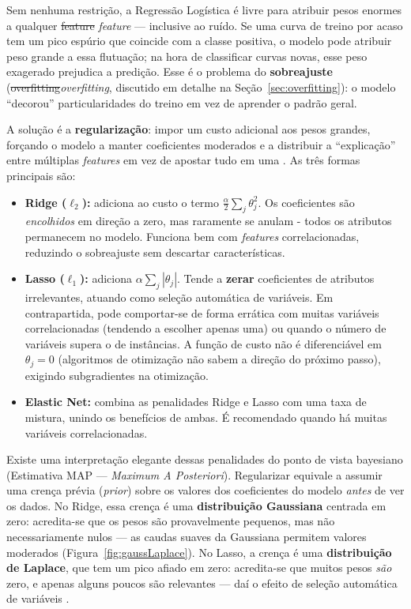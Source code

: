 \documentclass[msc]{on} %
\makeatletter
\providecommand{\DIFaddtex}[1]{{\protect\color{red}#1}} %
\providecommand{\DIFdeltex}[1]{{\protect\color{red}\sout{#1}}} %
\providecommand{\DIFaddbegin}{} %
\providecommand{\DIFaddend}{} %
\providecommand{\DIFdelbegin}{} %
\providecommand{\DIFdelend}{} %
\providecommand{\DIFadd}[1]{\texorpdfstring{\DIFaddtex{#1}}{#1}} %
\providecommand{\DIFdel}[1]{\texorpdfstring{\DIFdeltex{#1}}{}} %
\let\sout@orig\sout %
\renewcommand{\sout}[1]{\ifmmode\text{\sout@orig{\ensuremath{#1}}}\else\sout@orig{#1}\fi} %
\makeatother
\begin{document}
Sem nenhuma restrição, a Regressão Logística é livre para atribuir pesos enormes a qualquer \DIFdelbegin \DIFdel{feature }\DIFdelend \DIFaddbegin \textit{\DIFadd{feature}} \DIFaddend --- inclusive ao ruído. Se uma curva de treino por acaso tem um pico espúrio que coincide com a classe positiva, o modelo pode atribuir peso grande a essa flutuação; na hora de classificar curvas novas, esse peso exagerado prejudica a predição. Esse é o problema do \textbf{sobreajuste} (\DIFdelbegin \DIFdel{overfitting}\DIFdelend \DIFaddbegin \textit{\DIFadd{overfitting}}\DIFaddend , discutido em detalhe na Seção~\ref{sec:overfitting}): o modelo ``decorou'' particularidades do treino em vez de aprender o padrão geral.

A solução é a \textbf{regularização}: impor um custo adicional aos pesos grandes, forçando o modelo a manter coeficientes moderados e a distribuir a ``explicação'' entre múltiplas \textit{features} em vez de apostar tudo em uma \citep{geron2019maos, Levada2026}. As três formas principais são:

\begin{itemize}
	\item \textbf{Ridge (\(\ell_2\)):} adiciona ao custo o termo \(\frac{\alpha}{2} \sum_j \theta_j^2\). Os coeficientes são \textit{encolhidos} em direção a zero, mas raramente se anulam - todos os atributos permanecem no modelo. Funciona bem com \textit{features} correlacionadas, reduzindo o sobreajuste sem descartar características.

	\item \textbf{Lasso (\(\ell_1\)):} adiciona \(\alpha \sum_j |\theta_j|\). Tende a \textbf{zerar} coeficientes de atributos irrelevantes, atuando como seleção automática de variáveis. Em contrapartida, pode comportar-se de forma errática com muitas variáveis correlacionadas (tendendo a escolher apenas uma) ou quando o número de variáveis supera o de instâncias. A função de custo não é diferenciável em \(\theta_j = 0\) (algoritmos de otimização não sabem a direção do próximo passo), exigindo subgradientes na otimização.

	\item \textbf{Elastic Net:} combina as penalidades Ridge e Lasso com uma taxa de mistura, unindo os benefícios de ambas. É recomendado quando há muitas variáveis correlacionadas.
\end{itemize}

Existe uma interpretação elegante dessas penalidades do ponto de vista bayesiano (Estimativa MAP --- \textit{Maximum A Posteriori}). Regularizar equivale a assumir uma crença prévia (\textit{prior}) sobre os valores dos coeficientes do modelo \emph{antes} de ver os dados. No Ridge, essa crença é uma \textbf{distribuição Gaussiana} centrada em zero: acredita-se que os pesos são provavelmente pequenos, mas não necessariamente nulos --- as caudas suaves da Gaussiana permitem valores moderados (Figura~\ref{fig:gaussLaplace}). No Lasso, a crença é uma \textbf{distribuição de Laplace}, que tem um pico afiado em zero: acredita-se que muitos pesos \emph{são} zero, e apenas alguns poucos são relevantes --- daí o efeito de seleção automática de variáveis \citep{geron2019maos, Levada2026}.
\end{document}
